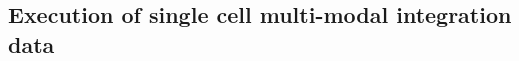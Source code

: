 \begin{description}
\end{description}





\subsection{Execution of single cell multi-modal integration data}
